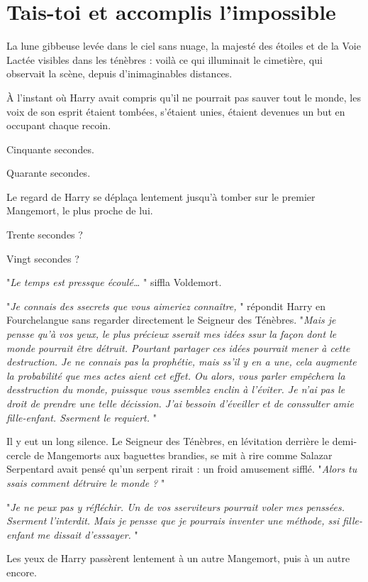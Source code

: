 
\chapter{Tais-toi et accomplis l'impossible}

La lune gibbeuse levée dans le ciel sans nuage, la majesté des étoiles et de la Voie Lactée visibles dans les ténèbres : voilà ce qui illuminait le cimetière, qui observait la scène, depuis d'inimaginables distances.

À l'instant où Harry avait compris qu'il ne pourrait pas sauver tout le monde, les voix de son esprit étaient tombées, s'étaient unies, étaient devenues un but en occupant chaque recoin.

Cinquante secondes.

Quarante secondes.

Le regard de Harry se déplaça lentement jusqu'à tomber sur le premier Mangemort, le plus proche de lui.

Trente secondes ?

Vingt secondes ?

"\emph{Le temps est pressque écoulé…} " siffla Voldemort.

"\emph{Je connais des ssecrets que vous aimeriez connaître,} " répondit Harry en Fourchelangue sans regarder directement le Seigneur des Ténèbres. "\emph{Mais je pensse qu'à vos yeux, le plus précieux sserait mes idées ssur la façon dont le monde pourrait être détruit. Pourtant partager ces idées pourrait mener à cette destruction. Je ne connais pas la prophétie, mais ss'il y en a une, cela augmente la probabilité que mes actes aient cet effet. Ou alors, vous parler empêchera la desstruction du monde, puissque vous ssemblez enclin à l'éviter. Je n'ai pas le droit de prendre une telle décission. J'ai bessoin d'éveiller et de conssulter amie fille-enfant. Sserment le requiert.} "

Il y eut un long silence. Le Seigneur des Ténèbres, en lévitation derrière le demi-cercle de Mangemorts aux baguettes brandies, se mit à rire comme Salazar Serpentard avait pensé qu'un serpent rirait : un froid amusement sifflé. "\emph{Alors tu ssais comment détruire le monde ?} "

"\emph{Je ne peux pas y réfléchir. Un de vos sserviteurs pourrait voler mes penssées. Sserment l'interdit. Mais je pensse que je pourrais inventer une méthode, ssi fille-enfant me dissait d'esssayer.} "

Les yeux de Harry passèrent lentement à un autre Mangemort, puis à un autre encore.

